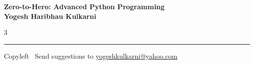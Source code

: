 \documentclass[8pt,landscape]{article}
\begin{document}
\footnotesize


\begin{center}
\Large{\textbf{Zero-to-Hero: Advanced Python Programming\\ Yogesh Haribhau Kulkarni}}  
\end{center}

\begin{multicols}{3}
	
\end{multicols}

\rule{\linewidth}{0.25pt}
\scriptsize
Copyleft \textcopyleft\  Send suggestions to 
\href{http://www.yogeshkulkarni.com}{yogeshkulkarni@yahoo.com}
\end{document}
